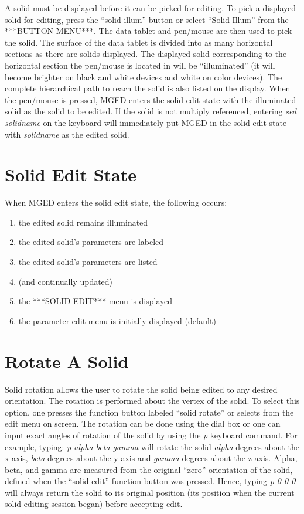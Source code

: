 A solid must be displayed before it can be picked for editing.
To pick a displayed solid for editing, press the ``solid illum'' button or
select ``Solid Illum'' from the ***BUTTON MENU***.
The data tablet and pen/mouse are then used to pick the solid.
The surface of the data tablet is divided into as many horizontal sections
as there are solids displayed.
The displayed solid corresponding to the horizontal section the pen/mouse
is located in will be ``illuminated'' (it will become brighter on black and
white devices and white on color devices).
The complete hierarchical path to reach the solid is also listed on the
display.  When the pen/mouse is pressed, MGED enters the solid edit state
with the illuminated solid as the solid to be edited.
If the solid is not multiply referenced, entering {\em sed solidname} on
the keyboard will immediately put MGED in the solid edit state with
{\em solidname} as the edited solid.

\section{Solid Edit State}

When MGED enters the solid edit state, the following occurs:

\begin{enumerate}
\item the edited solid remains illuminated
\item the edited solid's parameters are labeled
\item the edited solid's parameters are listed
\item  (and continually updated)
\item the ***SOLID EDIT*** menu is displayed
\item the parameter edit menu is initially displayed (default)
\end{enumerate}

\section{Rotate A Solid}

Solid rotation allows the user to rotate the solid being edited to any
desired orientation.  The rotation is performed about the vertex of the
solid.  To select this option, one presses the function button labeled
``solid rotate'' or selects from the edit menu on screen.
The rotation can be done using the dial box or one can input exact angles
of rotation of the solid by using the {\em p} keyboard command.
For example, typing:
{\em \center
p alpha beta gamma
}
will rotate the solid {\em alpha} degrees about the x-axis, {\em beta} degrees
about the y-axis and {\em gamma} degrees about the z-axis.  Alpha, beta, and
gamma are measured from the original ``zero'' orientation of the solid,
defined when the ``solid edit'' function button was
pressed.  Hence, typing
{\em \center
p 0 0 0
}
will always return the solid to its original position (its position when the
current solid editing session began) before accepting edit.

